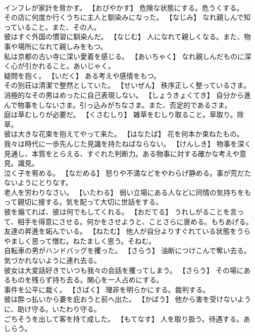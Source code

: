 \documentclass[8pt]{extreport}
\begin{document}
\begin{CJK}{UTF8}{min}
\\	インフレが家計を脅かす。	【おびやかす】 危険な状態にする。危うくする。
\\	その店に何度か行くうちに主人と馴染みになった。	【なじみ】 なれ親しんで知っていること。また、その人。
\\	彼はすぐ外国の慣習に馴染んだ。	【なじむ】 人になれて親しくなる。また、物事や場所になれて親しみをもつ。
\\	私は京都の古い寺に深い愛着を感じる。	【あいちゃく】 なれ親しんだものに深く心が引かれること。あいじゃく。
\\	疑問を抱く。	【いだく】 ある考えや感情をもつ。
\\	その別荘は清潔で整然としていた。	【せいぜん】 秩序正しく整っているさま。
\\	消極的なその男はめったに自己表現しない。	【しょうきょくてき】 自分から進んで物事をしないさま。引っ込みがちなさま。また、否定的であるさま。
\\	庭は草むしりが必要だ。	【くさむしり】 雑草をむしり取ること。草取り。除草。
\\	彼は大きな花束を抱えてやって来た。	【はなたば】 花を何本か束ねたもの。
\\	我々は時代に一歩先んじた見識を持たねばならない。	【けんしき】 物事を深く見通し、本質をとらえる、すぐれた判断力。ある物事に対する確かな考えや意見。識見。
\\	泣く子を宥める。	【なだめる】 怒りや不満などをやわらげ静める。事が荒だたないようにとりなす。
\\	老人を労わりなさい。	【いたわる】 弱い立場にある人などに同情の気持ちをもって親切に接する。気を配って大切に世話をする。
\\	彼を煽てれば、彼は何でもしてくれる。	【おだてる】 うれしがることを言って、相手を得意にさせる。何かをさせようと、ことさらに褒める。もちあげる。
\\	友達の昇進を妬んでいる。	【ねたむ】 他人が自分よりすぐれている状態をうらやましく思って憎む。ねたましく思う。そねむ。
\\	自転車の男がハンドバッグを攫った。	【さらう】 油断につけこんで奪い去る。気づかれないように連れ去る。
\\	彼女は大変話好きでいつも我々の会話を攫ってしまう。	【さらう】 その場にあるものを残らず持ち去る。関心を一人占めにする。
\\	事件を公平に裁く。	【さばく】 理非を明らかにする。裁判する。
\\	彼は酔っ払いから妻を庇おうと前へ出た。	【かばう】 他から害を受けないように、助け守る。いたわり守る。
\\	ごちそうを出して客を持て成した。	【もてなす】 人を取り扱う。待遇する。あしらう。

\end{CJK}
\end{document}
